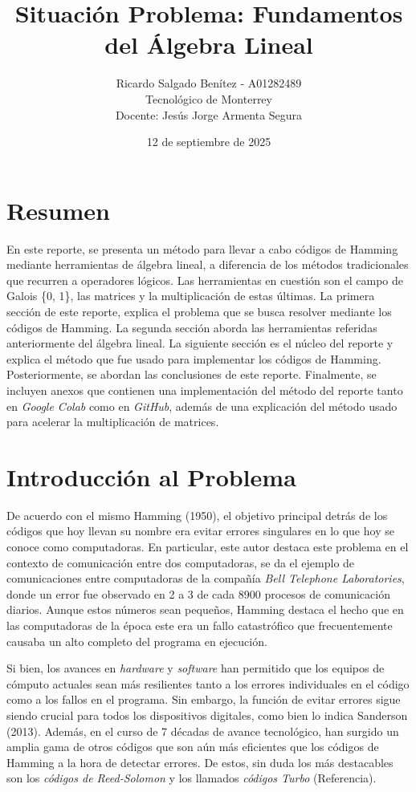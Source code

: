 \documentclass{article}
\title{Situación Problema: Fundamentos del Álgebra Lineal}
\author{Ricardo Salgado Benítez - A01282489 \\ Tecnológico de Monterrey \\ Docente: Jesús Jorge Armenta Segura}
\date{12 de septiembre de 2025}
\begin{document}
\maketitle
\newpage
\section{Resumen}

En este reporte, se presenta un método para llevar a cabo códigos de Hamming mediante herramientas de álgebra lineal, a diferencia de los métodos tradicionales que recurren a operadores lógicos. Las herramientas en cuestión son el campo de Galois \{0, 1\}, las matrices y la multiplicación de estas últimas. La primera sección de este reporte, explica el problema que se busca resolver mediante los códigos de Hamming. La segunda sección aborda las herramientas referidas anteriormente del álgebra lineal. La siguiente sección es el núcleo del reporte y explica el método que fue usado para implementar los códigos de Hamming. Posteriormente, se abordan las conclusiones de este reporte. Finalmente, se incluyen anexos que contienen una implementación del método del reporte tanto en \textit{Google Colab} como en \textit{GitHub}, además de una explicación del método usado para acelerar la multiplicación de matrices.

\section{Introducción al Problema}

De acuerdo con el mismo Hamming (1950), el objetivo principal detrás de los códigos que hoy llevan su nombre era evitar errores singulares en lo que hoy se conoce como computadoras. En particular, este autor destaca este problema en el contexto de comunicación entre dos computadoras, se da el ejemplo de comunicaciones entre computadoras de la compañía \textit{Bell Telephone Laboratories}, donde un error fue observado en 2 a 3 de cada 8900 procesos de comunicación diarios. Aunque estos números sean pequeños, Hamming destaca el hecho que en las computadoras de la época este era un fallo catastrófico que frecuentemente causaba un alto completo del programa en ejecución.

Si bien, los avances en \textit{hardware} y \textit{software} han permitido que los equipos de cómputo actuales sean más resilientes tanto a los errores individuales en el código como a los fallos en el programa. Sin embargo, la función de evitar errores sigue siendo crucial para todos los dispositivos digitales, como bien lo indica Sanderson (2013). Además, en el curso de 7 décadas de avance tecnológico, han surgido un amplia gama de otros códigos que son aún más eficientes que los códigos de Hamming a la hora de detectar errores. De estos, sin duda los más destacables son los \textit{códigos de Reed-Solomon} y los llamados \textit{códigos Turbo} (Referencia).
\end{document}
